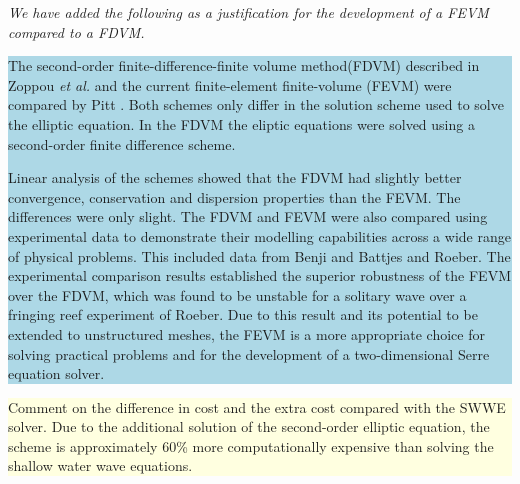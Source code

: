 \documentclass[subeqn]{article}
\newcommand{\hlb}[1] {\par\colorbox{lightblue}{\parbox{\linewidth}{#1}}}
\newcommand{\hly}[1] {\par\colorbox{lightyellow}{\parbox{\linewidth}{#1}}}
\begin{document}
\emph{We have added the following as a justification for the development of a FEVM compared to a FDVM.}
\hlb{The second-order finite-difference-finite volume method(FDVM) described in Zoppou \emph{et al.}\cite{Zoppou-etal-2017} and the current finite-element finite-volume  (FEVM) were compared by Pitt \cite{Pitt-2019}. Both schemes only differ in the solution scheme used to solve the elliptic equation. In the FDVM the eliptic equations were solved using a second-order finite difference scheme.

Linear analysis of the schemes showed that the FDVM had slightly better convergence, conservation and dispersion properties than the FEVM. The differences were only slight. The FDVM and FEVM were also compared using experimental data to demonstrate their modelling capabilities across a wide range of physical problems. This included data from Benji and Battjes\cite{Benji-Battjes-1994-1} and Roeber\cite{Roeber-2010}. The experimental comparison results established the superior robustness of the FEVM over the FDVM, which was found to be unstable for a solitary wave over a fringing reef experiment of Roeber\cite{Roeber-2010}. Due to this result and its potential to be extended to unstructured meshes, the FEVM is a more appropriate choice for solving practical problems and for the development of a two-dimensional Serre equation solver.}
\hly{Comment on the difference in cost and the extra cost compared with the SWWE solver. Due to the additional solution of the second-order elliptic equation, the scheme is approximately 60\% more computationally expensive than solving the shallow water wave equations\cite{Zoppou-etal-2014}.}
%
\end{document}
